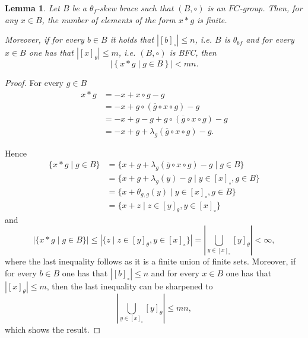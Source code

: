 \documentclass{amsart}
\newtheorem{lem}[thm]{Lemma}
\begin{document}
\begin{lem}
\label{bound x*g}
Let $B$ be a $\theta_{f}$-skew brace such that 
$(B,\circ)$ is an $FC$-group. Then, for any $x\in B$, the number of elements of the form $x*g$ is finite. 

Moreover, if for every $b\in B$ it holds that $|[b]_\circ |\leq n$, i.e. $B$ is $\theta_{bf}$ and for every $x\in B$ one has that $|[x]_\theta|\leq m$, i.e. $(B,\circ)$ is BFC, then 
  \[
  |\left\lbrace x*g \mid g \in B\right\rbrace|<mn.
  \]
\end{lem}
\begin{proof}
For every $g\in B$
     \begin{align*}
        x*g &= -x+x \circ g - g\\ &=-x + g \circ (\overline{g} \circ x \circ g) -g \\
        &= -x+g-g+g\circ (\overline{g} \circ x \circ g) - g \\ &= -x+g+\lambda_g(\overline{g} \circ x \circ g)-g.
    \end{align*}

    Hence 
    \begin{align*}
        \{x*g\mid g\in B\}&
        =\{x+g+\lambda_g(\overline{g} \circ x \circ g)-g\mid g\in B\}\\
        &=\{x+g+\lambda_g(y)-g\mid y\in[x]_\circ , g\in B\}\\
        &=\{x+\theta_{g,g}(y)\mid y\in[x]_\circ, g\in B\}\\
        &=\{x+z\mid z\in[y]_\theta, y\in[x]_\circ\}
    \end{align*}
    and 
    \[
    |\{x*g\mid g\in B\}|\leq
    \left|\{z\mid z\in[y]_\theta, y\in[x]_\circ\}\right|=
    \left|\bigcup_{y\in [x]_\circ}[y]_\theta\right|<\infty,
    \]
    where the last inequality follows as it is a finite union of finite sets. Moreover, if for every $b\in B$ one has that $|[b]_\circ |\leq n$ and for every $x\in B$ one has that $|[x]_\theta|\leq m$, then the last inequality can be sharpened to
  $$ \left|\bigcup_{y\in [x]_\circ}[y]_\theta\right|\leq mn, $$
  which shows the result.
\end{proof}
\end{document}
